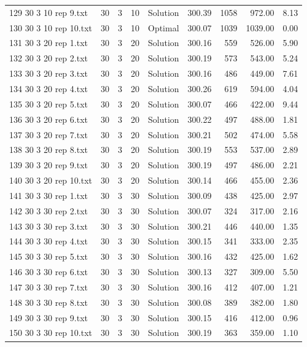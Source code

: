 \begin{longtable}{lrrllrrrr}
129 30 3 10 rep 9.txt & 30 & 3 & 10 & Solution & 300.39 & 1058 & 972.00 &  8.13\\
130 30 3 10 rep 10.txt & 30 & 3 & 10 & Optimal & 300.07 & 1039 & 1039.00 &  0.00\\
131 30 3 20 rep 1.txt & 30 & 3 & 20 & Solution & 300.16 & 559 & 526.00 &  5.90\\
132 30 3 20 rep 2.txt & 30 & 3 & 20 & Solution & 300.19 & 573 & 543.00 &  5.24\\
133 30 3 20 rep 3.txt & 30 & 3 & 20 & Solution & 300.16 & 486 & 449.00 &  7.61\\
134 30 3 20 rep 4.txt & 30 & 3 & 20 & Solution & 300.26 & 619 & 594.00 &  4.04\\
135 30 3 20 rep 5.txt & 30 & 3 & 20 & Solution & 300.07 & 466 & 422.00 &  9.44\\
136 30 3 20 rep 6.txt & 30 & 3 & 20 & Solution & 300.22 & 497 & 488.00 &  1.81\\
137 30 3 20 rep 7.txt & 30 & 3 & 20 & Solution & 300.21 & 502 & 474.00 &  5.58\\
138 30 3 20 rep 8.txt & 30 & 3 & 20 & Solution & 300.19 & 553 & 537.00 &  2.89\\
139 30 3 20 rep 9.txt & 30 & 3 & 20 & Solution & 300.19 & 497 & 486.00 &  2.21\\
140 30 3 20 rep 10.txt & 30 & 3 & 20 & Solution & 300.14 & 466 & 455.00 &  2.36\\
141 30 3 30 rep 1.txt & 30 & 3 & 30 & Solution & 300.09 & 438 & 425.00 &  2.97\\
142 30 3 30 rep 2.txt & 30 & 3 & 30 & Solution & 300.07 & 324 & 317.00 &  2.16\\
143 30 3 30 rep 3.txt & 30 & 3 & 30 & Solution & 300.21 & 446 & 440.00 &  1.35\\
144 30 3 30 rep 4.txt & 30 & 3 & 30 & Solution & 300.15 & 341 & 333.00 &  2.35\\
145 30 3 30 rep 5.txt & 30 & 3 & 30 & Solution & 300.16 & 432 & 425.00 &  1.62\\
146 30 3 30 rep 6.txt & 30 & 3 & 30 & Solution & 300.13 & 327 & 309.00 &  5.50\\
147 30 3 30 rep 7.txt & 30 & 3 & 30 & Solution & 300.16 & 412 & 407.00 &  1.21\\
148 30 3 30 rep 8.txt & 30 & 3 & 30 & Solution & 300.08 & 389 & 382.00 &  1.80\\
149 30 3 30 rep 9.txt & 30 & 3 & 30 & Solution & 300.15 & 416 & 412.00 &  0.96\\
150 30 3 30 rep 10.txt & 30 & 3 & 30 & Solution & 300.19 & 363 & 359.00 &  1.10\\

\end{longtable}
